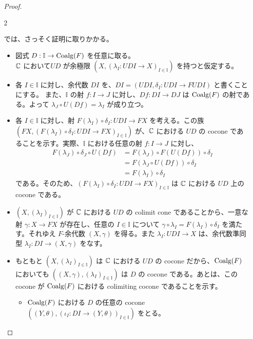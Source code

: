 \documentclass[
		head_space=20mm,
		foot_space=20mm,
		gutter=10mm,
		line_length=190mm
]{jlreq}
\begin{document}
\begin{proof}
\begin{multicols}{2}
\begin{center}
\begin{small}
\begin{tikzcd}[column sep=10pt]
			\end{tikzcd}
		\end{small}
	\end{center} 
	\end{multicols} %
	\noindent では、さっそく証明に取りかかる。
	\begin{itemize}
		\item 図式 $D:\mathbb I\to\mathrm{Coalg}(F)$ を任意に取る。\\ $\mathbb{C}$ において$UD$ が余極限 $(X,(\lambda_I:UDI\to X)_{I\in\mathbb I})$ を持つと仮定する。
		\item 各 $I\in\mathbb I$ に対し、余代数 $DI$ を、$DI=(UDI,\delta_I:UDI\to FUDI)$ と書くことにする。
		また、$\mathbb I$ の射 $f:I\to J$ に対し、$Df:DI\to DJ$ は $\mathrm{Coalg}(F)$ の射である。よって $\lambda_{J}\circ U(Df)=\lambda_I$ が成り立つ。
		\item 各 $I\in\mathbb I$ に対し、射 $F(\lambda_I)\circ\delta_I:UDI\to FX$ を考える。この族 $(FX,(F(\lambda_I)\circ\delta_I:UDI\to FX)_{I\in\mathbb I})$ が、$\mathbb{C}$ における $UD$ の cocone であることを示す。実際、$\mathbb I$ における任意の射 $f:I\to J$ に対し、
		\begin{align*}
			F(\lambda_J)\circ\delta_J\circ U(Df) &= F(\lambda_J)\circ F(U(Df))\circ\delta_I\\ &= F(\lambda_J\circ U(Df))\circ\delta_I\\&= F(\lambda_I)\circ\delta_I
		\end{align*}
		である。そのため、$(F(\lambda_I)\circ\delta_I:UDI\to FX)_{I\in\mathbb I}$ は $\mathbb{C}$ における $UD$ 上の cocone である。
		\item $(X,(\lambda_I)_{I\in\mathbb I})$ が $\mathbb{C}$ における $UD$ の colimit cone であることから、一意な射 $\gamma:X\to FX$ が存在し、任意の $I\in\mathbb I$ について $\gamma\circ\lambda_I=F(\lambda_I)\circ\delta_I$ を満たす。それゆえ $F$-余代数 $(X,\gamma)$ を得る。また $\lambda_I:UDI\to X$ は、余代数準同型 $\lambda_I:DI\to(X,\gamma)$ をなす。
		\item もともと $(X,(\lambda_I)_{I\in\mathbb I})$ は $\mathbb{C}$ における $UD$ の cocone だから、$\mathrm{Coalg}(F)$ においても $((X,\gamma),(\lambda_I)_{I\in\mathbb I})$ は $D$ の cocone である。あとは、この cocone が $\mathrm{Coalg}(F)$ における colimiting cocone であることを示す。
		\begin{itemize}
			\item $\mathrm{Coalg}(F)$ における $D$ の任意の cocone $((Y,\theta),(\iota_I:DI\to(Y,\theta))_{I\in\mathbb I})$ をとる。%

\end{itemize}
\end{itemize}
\end{proof}
\end{document}
